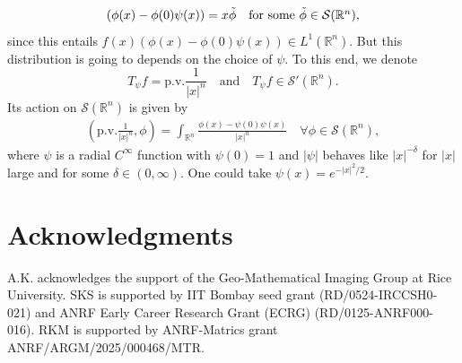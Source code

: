 \documentclass[11pt]{article}
\newcommand{\abs}[1]{\lvert #1 \rvert}
\newcommand{\srn}{\mathcal{S}'(\Rn)}
\newcommand{\R}[1]{{\color{red} [#1]}}
\newcommand*\Rn{\mathbb{R}^n}
\newcommand{\sch}{\mathcal{S}}
\begin{document}
\begin{align*}
 ( \phi(x)- \phi(0) \psi(x))= x\Tilde{\phi} \quad \mbox{for some $\Tilde{\phi}\in \sch(\Rn)$},   
\end{align*}
since this entails $f(x)( \phi(x)- \phi(0) \psi(x))\in L^1(\Rn)$. But this distribution is going to  depends on the choice of  $\psi$.
To this end, we  denote \[T_{\psi}f =\mathrm{p.v.}\frac{1}{\abs{x}^n} \quad \mbox{and}\quad T_{\psi}f\in \srn.\]
Its action on $\sch(\Rn)$ is given by 
\begin{align}
    \left(\mathrm{p.v.}\frac{1}{\abs{x}^n}, \phi\right) = \int_{\Rn} \frac{\phi(x) -\psi(0) \psi(x)}{\abs{x}^n} \quad \forall \phi \in \sch(\Rn),
\end{align}
where $\psi$  is a radial  $C^{\infty}$ function with $\psi(0)=1$ and $\abs{\psi}$ behaves like $\abs{x}^{-\delta}$ for $\abs{x}$ large and for some  $\delta\in (0, \infty)$. One could take $ \psi(x) = e^{-\abs{x}^2/2}.$



\section{Acknowledgments}\label{sec:acknowledgement}

A.K. acknowledges the support of the Geo-Mathematical Imaging Group at Rice University. SKS is supported by IIT Bombay
seed grant (RD/0524-IRCCSH0-021) and ANRF Early Career Research Grant (ECRG) (RD/0125-ANRF000-016). RKM is supported by ANRF-Matrics grant ANRF/ARGM/2025/000468/MTR.


	
\end{document}
